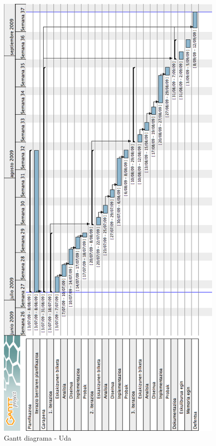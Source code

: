\begin{figure}[htp]
\begin{center}
\includegraphics[scale=0.5]{Pictures/Chapter3/Gantt-txikia.png}
\caption{Gantt diagrama - Uda}
\label{gantt.txikia}
\end{center}
\end{figure}

